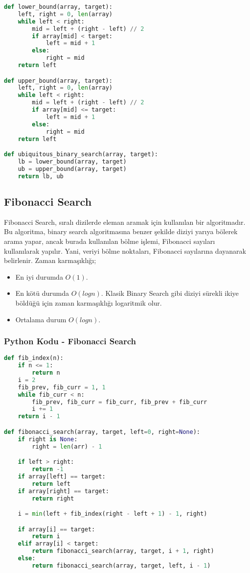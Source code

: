 \begin{lstlisting}[language=Python]
def lower_bound(array, target):
    left, right = 0, len(array)
    while left < right:
        mid = left + (right - left) // 2
        if array[mid] < target:
            left = mid + 1
        else:
            right = mid
    return left

def upper_bound(array, target):
    left, right = 0, len(array)
    while left < right:
        mid = left + (right - left) // 2
        if array[mid] <= target:
            left = mid + 1
        else:
            right = mid
    return left

def ubiquitous_binary_search(array, target):
    lb = lower_bound(array, target)
    ub = upper_bound(array, target)
    return lb, ub
\end{lstlisting}

\newpage

\subsection{Fibonacci Search}

Fibonacci Search, sıralı dizilerde eleman aramak için kullanılan bir algoritmadır. Bu algoritma, binary search algoritmasına benzer şekilde diziyi yarıya bölerek arama yapar, ancak burada kullanılan bölme işlemi, Fibonacci sayıları kullanılarak yapılır. Yani, veriyi bölme noktaları, Fibonacci sayılarına dayanarak belirlenir. Zaman karmaşıklığı;

\begin{itemize}
    \item En iyi durumda $O(1)$.
    \item En kötü durumda $O(logn)$. Klasik Binary Search gibi diziyi sürekli ikiye böldüğü için zaman karmaşıklığı logaritmik olur.
    \item Ortalama durum $O(logn)$.
\end{itemize}

\subsubsection{Python Kodu - Fibonacci Search}

\begin{lstlisting}[language=Python]
def fib_index(n):
    if n <= 1:
        return n
    i = 2
    fib_prev, fib_curr = 1, 1
    while fib_curr < n:
        fib_prev, fib_curr = fib_curr, fib_prev + fib_curr
        i += 1
    return i - 1

def fibonacci_search(array, target, left=0, right=None):
    if right is None:
        right = len(arr) - 1

    if left > right:
        return -1
    if array[left] == target:
        return left
    if array[right] == target:
        return right

    i = min(left + fib_index(right - left + 1) - 1, right)

    if array[i] == target:
        return i
    elif array[i] < target:
        return fibonacci_search(array, target, i + 1, right)
    else:
        return fibonacci_search(array, target, left, i - 1)
\end{lstlisting}

\newpage